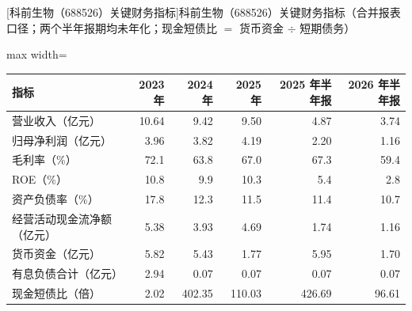 \begin{center}\small\setlength{\tabcolsep}{3.4pt}
[科前生物（688526）关键财务指标]{科前生物（688526）关键财务指标（合并报表口径；两个半年报期均未年化；现金短债比 $=$ 货币资金 $\div$ 短期债务）}
\begin{adjustbox}{max width=\textwidth}
\begin{tabular}{@{}lrrrrr@{}}
\toprule
指标 & 2023 年 & 2024 年 & 2025 年 & 2025 年半年报 & 2026 年半年报 \\
\midrule
营业收入（亿元） & 10.64 & 9.42 & 9.50 & 4.87 & 3.74 \\
归母净利润（亿元） & 3.96 & 3.82 & 4.19 & 2.20 & 1.16 \\
毛利率（\%） & 72.1 & 63.8 & 67.0 & 67.3 & 59.4 \\
ROE（\%） & 10.8 & 9.9 & 10.3 & 5.4 & 2.8 \\
资产负债率（\%） & 17.8 & 12.3 & 11.5 & 11.4 & 10.7 \\
经营活动现金流净额（亿元） & 5.38 & 3.93 & 4.69 & 1.74 & 1.16 \\
货币资金（亿元） & 5.82 & 5.43 & 1.77 & 5.95 & 1.70 \\
有息负债合计（亿元） & 2.94 & 0.07 & 0.07 & 0.07 & 0.07 \\
现金短债比（倍） & 2.02 & 402.35 & 110.03 & 426.69 & 96.61 \\
\bottomrule
\end{tabular}
\end{adjustbox}
\end{center}

